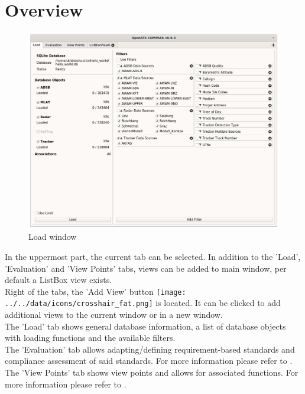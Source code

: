 \section{Overview}
\label{sec:load_overview}

\begin{figure}[H]
  \hspace*{-2.5cm}
    \includegraphics[width=19cm]{figures/load.png}
  \caption{Load window}
\end{figure}

In the uppermost part, the current tab can be selected. In addition to the 'Load', 'Evaluation' and 'View Points' tabs, views can be added to main window, per default a ListBox view exists. \\

Right of the tabs, the 'Add View' button \texttt{[image: ../../data/icons/crosshair\_fat.png]} is located. It can be clicked to add additional views to the current window or in a new window. \\

The 'Load' tab shows general database information, a list of database objects with loading functions and the available filters. \\

The 'Evaluation' tab allows adapting/defining requirement-based standards  and compliance assessment of said standards. For more information please refer to . \\

The 'View Points' tab shows view points and allows for associated functions. For more information please refer to .

